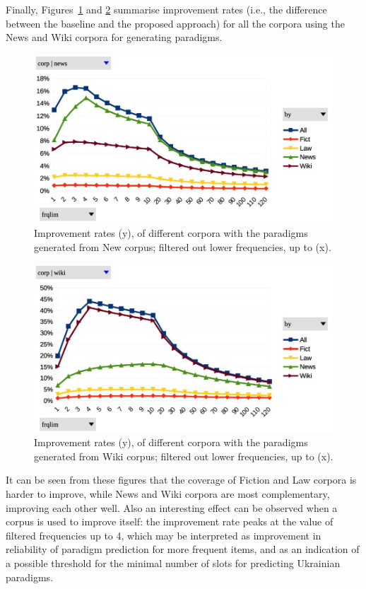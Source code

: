 \documentclass[11pt,a4paper]{article}
\begin{document}
Finally, Figures~\ref{fig:pcDiffNoTypNews} and \ref{fig:pcDiffNoTypWiki} summarise improvement rates (i.e., the difference between the baseline and the proposed approach) for all the corpora using the News and Wiki corpora for generating paradigms.

\begin{figure}
	\includegraphics[width=\linewidth]{evaluation-improv-DiffNoTypNews.jpg}
	\caption{Improvement rates (y), of different corpora with the paradigms generated from New corpus; filtered out lower frequencies, up to (x).}
	\label{fig:pcDiffNoTypNews}
\end{figure}

\begin{figure}
	\includegraphics[width=\linewidth]{evaluation-improv-DiffNoTypWiki.jpg}
	\caption{Improvement rates (y), of different corpora with the paradigms generated from Wiki corpus; filtered out lower frequencies, up to (x).}
	\label{fig:pcDiffNoTypWiki}
\end{figure}


It can be seen from these figures that the coverage of Fiction and Law corpora is harder to improve, while News and Wiki corpora are most complementary, improving each other well. Also an interesting effect can be observed when a corpus is used to improve itself: the improvement rate peaks at the value of filtered frequencies up to 4, which may be interpreted as improvement in reliability of paradigm prediction for more frequent items, and as an indication of a possible threshold for the minimal number of slots for predicting Ukrainian paradigms.
\end{document}
